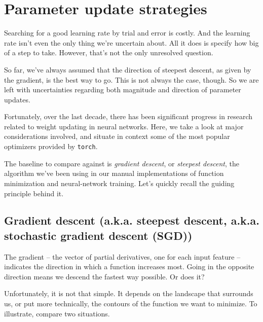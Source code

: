 \documentclass[
  letterpaper,
]{krantz}
\begin{document}
\hypertarget{parameter-update-strategies}{%
\section{Parameter update
strategies}\label{parameter-update-strategies}}

Searching for a good learning rate by trial and error is costly. And the
learning rate isn't even the only thing we're uncertain about. All it
does is specify how big of a step to take. However, that's not the only
unresolved question.

So far, we've always assumed that the direction of steepest descent, as
given by the gradient, is the best way to go. This is not always the
case, though. So we are left with uncertainties regarding both magnitude
and direction of parameter updates.

Fortunately, over the last decade, there has been significant progress
in research related to weight updating in neural networks. Here, we take
a look at major considerations involved, and situate in context some of
the most popular optimizers provided by \texttt{torch}.

The baseline to compare against is \emph{gradient descent}, or
\emph{steepest descent}, the algorithm we've been using in our manual
implementations of function minimization and neural-network training.
Let's quickly recall the guiding principle behind it.

\hypertarget{gradient-descent-a.k.a.-steepest-descent-a.k.a.-stochastic-gradient-descent-sgd}{%
\subsection{\texorpdfstring{Gradient descent (a.k.a. steepest descent,
a.k.a. stochastic gradient descent
(SGD))}{Gradient descent (a.k.a. steepest descent, a.k.a. stochastic gradient descent (SGD))}}\label{gradient-descent-a.k.a.-steepest-descent-a.k.a.-stochastic-gradient-descent-sgd}}

The gradient -- the vector of partial derivatives, one for each input
feature -- indicates the direction in which a function increases most.
Going in the opposite direction means we descend the fastest way
possible. Or does it?

Unfortunately, it is not that simple. It depends on the landscape that
surrounds us, or put more technically, the contours of the function we
want to minimize. To illustrate, compare two situations.
\end{document}

